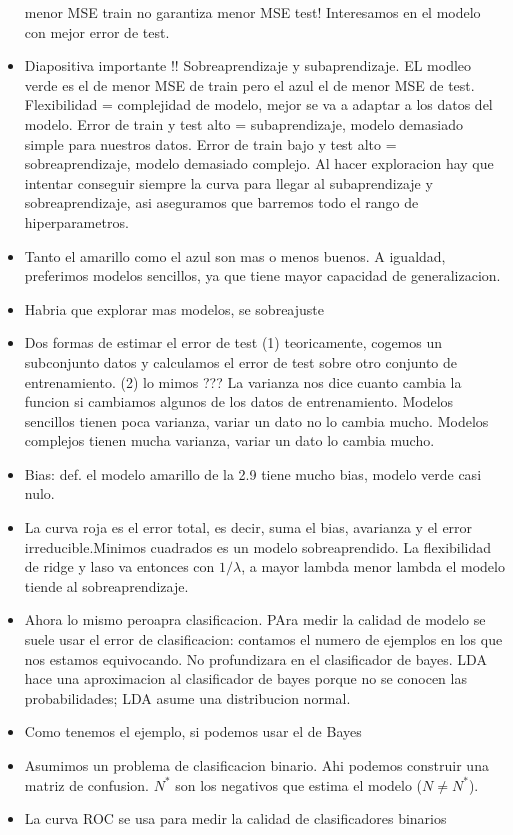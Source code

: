 \begin{itemize}
menor MSE train no garantiza menor MSE test! Interesamos en el modelo con mejor error de test. 
\item Diapositiva importante !! Sobreaprendizaje y subaprendizaje. EL modleo verde es el de menor MSE de train pero el azul el de menor MSE de test. Flexibilidad = complejidad de modelo, mejor se va a adaptar a los datos del modelo. Error de train y test alto = subaprendizaje, modelo demasiado simple para nuestros datos. Error de train bajo y test alto = sobreaprendizaje, modelo demasiado complejo. Al hacer exploracion hay que intentar conseguir siempre la curva para llegar al subaprendizaje y sobreaprendizaje, asi aseguramos que barremos todo el rango de hiperparametros.
\item Tanto el amarillo como el azul son mas o menos buenos. A igualdad, preferimos modelos sencillos, ya que tiene mayor capacidad de generalizacion. 
\item Habria que explorar mas modelos, se sobreajuste
\item Dos formas de estimar el error de test (1) teoricamente, cogemos un subconjunto datos y calculamos el error de test sobre otro conjunto de entrenamiento. (2) lo mimos ??? La varianza nos dice cuanto cambia la funcion si cambiamos algunos de los datos de entrenamiento. Modelos sencillos tienen poca varianza, variar un dato no lo cambia mucho. Modelos complejos tienen mucha varianza, variar un dato lo cambia mucho.
\item Bias: def. el modelo amarillo de la 2.9 tiene mucho bias, modelo verde casi nulo.  
\item La curva roja es el error total, es decir, suma el bias, avarianza y el error irreducible.Minimos cuadrados es un modelo sobreaprendido. La flexibilidad de ridge y laso va entonces con $1/\lambda$, a mayor lambda menor lambda el modelo tiende al sobreaprendizaje. 
\item Ahora lo mismo peroapra clasificacion. PAra medir la calidad de modelo se suele usar el error de clasificacion: contamos el numero de ejemplos en los que nos estamos equivocando. No profundizara en el clasificador de bayes. LDA hace una aproximacion al clasificador de bayes porque no se conocen las probabilidades; LDA asume una distribucion normal.
\item Como tenemos el ejemplo, si podemos usar el de Bayes
\item Asumimos un problema de clasificacion binario. Ahi podemos construir una matriz de confusion. $N^*$ son los negativos que estima el modelo ($N \neq N^*$).
\item La curva ROC se usa para medir la calidad de clasificadores binarios 
\end{itemize}

